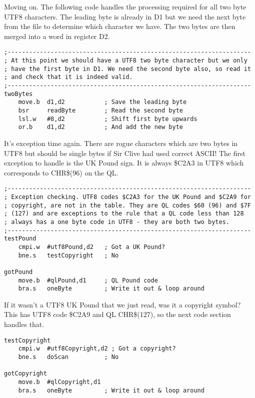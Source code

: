 Moving on. The following code handles the processing required for
all two byte UTF8 characters. The leading byte is already in D1 but
we need the next byte from the file to determine which character we
have. The two bytes are then merged into a word in register D2.

\begin{lstlisting}[firstnumber=last,caption={Utf82Ql: Handling UTF8 two byte characters}]
;--------------------------------------------------------------------
; At this point we should have a UTF8 two byte character but we only
; have the first byte in D1. We need the second byte also, so read it
; and check that it is indeed valid.
;--------------------------------------------------------------------
twoBytes
    move.b  d1,d2           ; Save the leading byte
    bsr     readByte        ; Read the second byte
    lsl.w   #8,d2           ; Shift first byte upwards
    or.b    d1,d2           ; And add the new byte
\end{lstlisting}

It's exception time again. There are rogue characters which are two
bytes in UTF8 but should be single bytes if Sir Clive had used correct
ASCII! The first exception to handle is the UK Pound sign. It is always
\$C2A3 in UTF8 which corresponds to CHR\$(96) on the QL.

\begin{lstlisting}[firstnumber=last,caption={Utf82Ql: Handling exceptions - the UK Pound symbol}]
;--------------------------------------------------------------------
; Exception checking. UTF8 codes $C2A3 for the UK Pound and $C2A9 for
; copyright, are not in the table. They are QL codes $60 (96) and $7F
; (127) and are exceptions to the rule that a QL code less than 128
; always has a one byte code in UTF8 - they are both two bytes.
;--------------------------------------------------------------------
testPound
    cmpi.w  #utf8Pound,d2   ; Got a UK Pound?
    bne.s   testCopyright   ; No

gotPound
    move.b  #qlPound,d1     ; QL Pound code
    bra.s   oneByte         ; Write it out & loop around
\end{lstlisting}

If it wasn't a UTF8 UK Pound that we just read, was it a copyright
symbol? This has UTF8 code \$C2A9 and QL CHR\$(127), so the next code
section handles that.

\begin{lstlisting}[firstnumber=last,caption={Utf82Ql: Handling exceptions - the copyright symbol}]
testCopyright
    cmpi.w  #utf8Copyright,d2 ; Got a copyright?
    bne.s   doScan          ; No

gotCopyright
    move.b  #qlCopyright,d1
    bra.s   oneByte         ; Write it out & loop around
\end{lstlisting}

